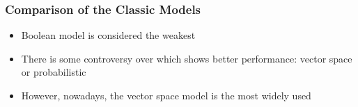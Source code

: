 \documentclass[svgnames]{beamer}
\begin{document}
\begin{frame}   \frametitle{Comparison of the Classic Models}

  \begin{block}{}
    \begin{itemize}
    \item Boolean model is considered the weakest
    \item There is some controversy over which shows better performance: vector
      space or probabilistic
    \item However, nowadays, the vector space model is the most widely used
    \end{itemize}
  \end{block}
\end{frame}


\end{document}
